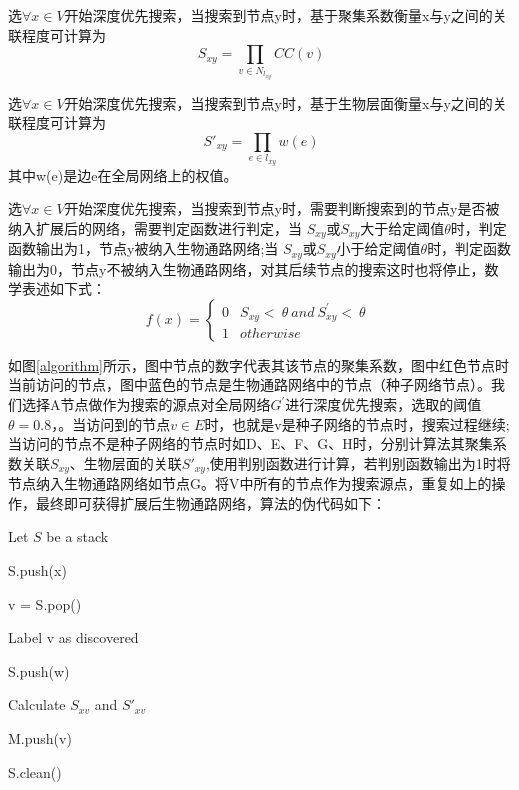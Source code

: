 选$\forall x\in V$开始深度优先搜索，当搜索到节点y时，基于聚集系数衡量x与y之间的关联程度可计算为 
 \begin{equation}
\ S_{xy} =\prod _{v\in N_{l_{xy}}} CC( v)
 \end{equation}

选$\forall x\in V$开始深度优先搜索，当搜索到节点y时，基于生物层面衡量x与y之间的关联程度可计算为 
 \begin{equation}
\ S'_{xy} =\prod _{e\in l_{xy}} w( e)
 \end{equation}
其中w(e)是边e在全局网络上的权值。

选$\forall x\in V$开始深度优先搜索，当搜索到节点y时，需要判断搜索到的节点y是否被纳入扩展后的网络，需要判定函数进行判定，当 $S_{xy}$或$S_{xy}$大于给定阈值$\theta$时，判定函数输出为1，节点y被纳入生物通路网络;当 $S_{xy}$或$S_{xy}$小于给定阈值$\theta$时，判定函数输出为0，节点y不被纳入生物通路网络，对其后续节点的搜索这时也将停止，数学表述如下式：
\begin{equation}
f( x) =\begin{cases}
0 & S_{xy} < \ \theta \ and\ S^{'}_{xy} < \ \theta \ \\
1 & otherwise
\end{cases}
\end{equation}

如图\ref{algorithm}所示，图中节点的数字代表其该节点的聚集系数，图中红色节点时当前访问的节点，图中蓝色的节点是生物通路网络中的节点（种子网络节点）。我们选择A节点做作为搜索的源点对全局网络$G^{'}$进行深度优先搜索，选取的阈值$\theta=0.8$，。当访问到的节点$v\in E$时，也就是v是种子网络的节点时，搜索过程继续;当访问的节点不是种子网络的节点时如D、E、F、G、H时，分别计算法其聚集系数关联$S_{xy}$、生物层面的关联$S'_{xy}$,使用判别函数进行计算，若判别函数输出为1时将节点纳入生物通路网络如节点G。将V中所有的节点作为搜索源点，重复如上的操作，最终即可获得扩展后生物通路网络，算法的伪代码如下：


\begin{algorithm}
%

{
	Let $S$ be a stack
	
	S.push(x)
	
	{
		v = S.pop()

        {
        	Label v as discovered

        	{
        		{
        			S.push(w)
        		}
        	  	
        	}

        	Calculate  $S_{xv}$ and $S'_{xv}$
        	
        	{
        		M.push(v)
        	}
        }
	}

	S.clean()
}
\end{algorithm}
\newpage

